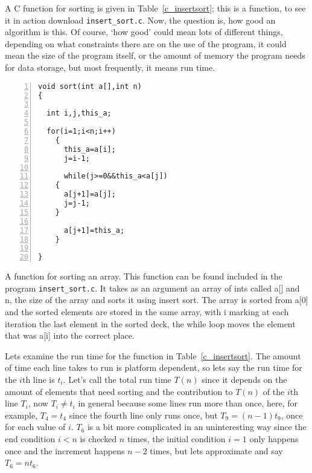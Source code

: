 \documentclass[11pt,a4paper]{scrartcl}
\begin{document}
A C function for sorting is given in Table~\ref{c_insertsort}; this is
a function, to see it in action download {\tt insert\_sort.c}. Now,
the question is, how good an algorithm is this. Of course, \lq{}how
good\rq{} could mean lots of different things, depending on what
constraints there are on the use of the program, it could mean the
size of the program itself, or the amount of memory the program needs
for data storage, but most frequently, it means run time.


\begin{table}
\begin{lstlisting}[numbers=left]
void sort(int a[],int n)
{

  int i,j,this_a;

  for(i=1;i<n;i++)
    {
      this_a=a[i];
      j=i-1;

      while(j>=0&&this_a<a[j])
	{
	  a[j+1]=a[j];
	  j=j-1;
	}

      a[j+1]=this_a;
    }

}
\end{lstlisting}
\caption{A function for sorting an array. This function can be found included in the program {\tt insert\_sort.c}. It takes as an argument an array of ints called a[] and n, the size of the array and sorts it using insert sort. The array is sorted from a[0] and the sorted elements are stored in the same array, with i marking at each iteration the last element in the sorted deck, the while loop moves the element that was a[i] into the correct place.\label{c_insertsort}}
\end{table}


Lets examine the run time for the function in
Table~\ref{c_insertsort}. The amount of time each line takes to run is
platform dependent, so lets say the run time for the $i$th line is
$t_i$. Let's call the total run time $T(n)$ since it depends on the
amount of elements that need sorting and the contribution to $T(n)$ of
the $i$th line $T_i$, now $T_i\not= t_i$ in general because some lines
run more than once, here, for example, $T_4=t_4$ since the fourth line
only runs once, but $T_9=(n-1)t_9$, once for each value of $i$. $T_6$
is a bit more complicated in an uninteresting way since the end
condition $i<n$ is checked $n$ times, the initial condition $i=1$ only
happens once and the increment happens $n-2$ times, but lets
approximate and say $T_6=nt_6$.
\end{document}
